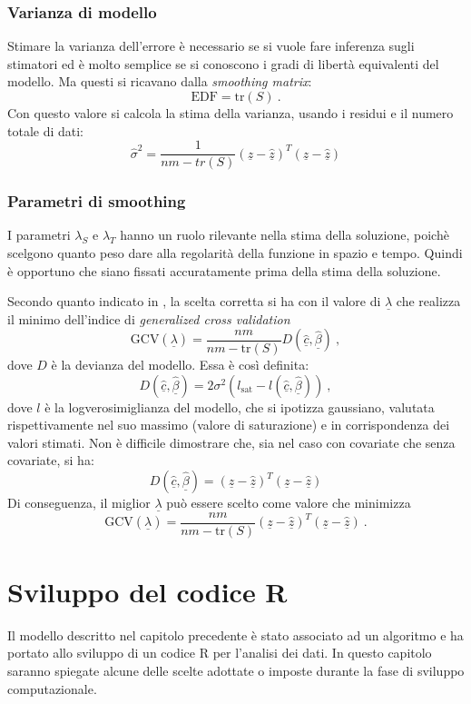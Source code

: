 \documentclass[a4paper,11pt,twoside,openright]{book}							%
\begin{document}
\subsection{Varianza di modello}
Stimare la varianza dell'errore è necessario se si vuole fare inferenza sugli stimatori ed è molto semplice se si conoscono i gradi di libertà equivalenti del modello. Ma questi si ricavano dalla \textit{smoothing matrix}:
$$
\mathrm{EDF}=\mathrm{tr}(S) \ .
$$
Con questo valore si calcola la stima della varianza, usando i residui e il numero totale di dati:
$$
\hat{\sigma}^2=\frac{1}{nm-tr(S)}(\underline z - \hat  {\underline z})^T(\underline z - \hat  {\underline z})
$$

\subsection{Parametri di smoothing}
I parametri $\lambda_S$ e $\lambda_T$ hanno un ruolo rilevante nella stima della soluzione, poichè scelgono quanto peso dare alla regolarità della funzione in spazio e tempo. Quindi è opportuno che siano fissati accuratamente prima della stima della soluzione.

Secondo quanto indicato in \cite{art:marra}, la scelta corretta si ha con il valore di $\underline \lambda$ che realizza il minimo dell'indice di \textit{generalized cross validation}
$$
\mathrm{GCV}(\underline \lambda) =\frac{nm}{nm-\text{tr}(S)}  D(\hat  {\underline c},\hat  {\underline \beta}) \ ,
$$
dove $D$ è la devianza del modello. Essa è così definita:
$$
D(\hat  {\underline c},\hat  {\underline \beta})=2\sigma^2(l_{\mathrm{sat}}-l(\hat  {\underline c},\hat  {\underline \beta})) \ ,
$$
dove $l$ è la logverosimiglianza del modello, che si ipotizza gaussiano, valutata rispettivamente nel suo massimo (valore di saturazione) e in corrispondenza dei valori stimati. Non è difficile dimostrare che, sia nel caso con covariate che senza covariate, si ha: 
$$
D(\hat  {\underline c},\hat  {\underline \beta}) = (\underline z - \hat  {\underline z})^T(\underline z - \hat  {\underline z})
$$
Di conseguenza, il miglior $\underline \lambda$ può essere scelto come valore che minimizza
\begin{equation}
\label{eq:GCV}
\mathrm{GCV}(\underline \lambda) =\frac{nm}{nm-\text{tr}(S)}  (\underline z - \hat  {\underline z})^T(\underline z - \hat  {\underline z}) \ .
\end{equation}
\newpage
\thispagestyle{empty}


\chapter{Sviluppo del codice R}
\label{cap:Codice}
Il modello descritto nel capitolo precedente è stato associato ad un algoritmo e ha portato allo sviluppo di un codice R per l'analisi dei dati. In questo capitolo saranno spiegate alcune delle scelte adottate o imposte durante la fase di sviluppo computazionale.
\end{document}
